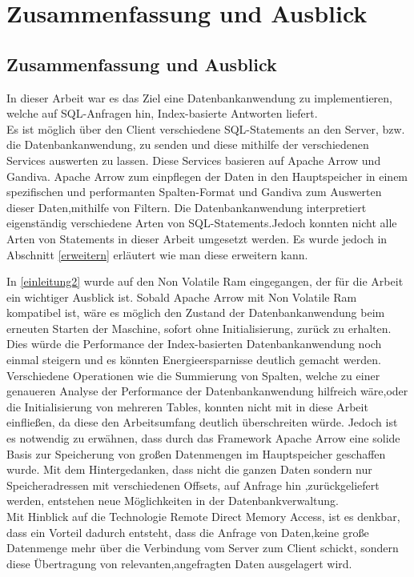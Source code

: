 \chapter{Zusammenfassung und Ausblick}
\label{Zusammenfassung}

\section{Zusammenfassung und Ausblick}

In dieser Arbeit war es das Ziel eine Datenbankanwendung zu implementieren, welche auf SQL-Anfragen hin, Index-basierte Antworten liefert. \\
Es ist möglich über den Client verschiedene SQL-Statements an den Server, bzw. die Datenbankanwendung, zu senden und diese mithilfe der verschiedenen Services auswerten zu lassen. 
Diese Services basieren auf Apache Arrow und Gandiva. Apache Arrow zum einpflegen der Daten in den Hauptspeicher in einem spezifischen und performanten Spalten-Format und Gandiva zum Auswerten dieser Daten,mithilfe von Filtern. 
Die Datenbankanwendung interpretiert eigenständig verschiedene Arten von SQL-Statements.Jedoch konnten nicht alle Arten von Statements in dieser Arbeit umgesetzt werden. 
Es wurde jedoch in Abschnitt \ref{erweitern} erläutert wie man diese erweitern kann.

In \ref{einleitung2} wurde auf den Non Volatile Ram eingegangen, der für die Arbeit ein wichtiger Ausblick ist. 
Sobald Apache Arrow mit Non Volatile Ram kompatibel ist, wäre es möglich den Zustand der Datenbankanwendung beim erneuten Starten der Maschine, sofort ohne Initialisierung, zurück zu erhalten. Dies würde die Performance der Index-basierten Datenbankanwendung noch einmal steigern und es könnten Energieersparnisse deutlich gemacht werden.
\\
Verschiedene Operationen wie die Summierung von Spalten, welche zu einer genaueren Analyse der Performance der Datenbankanwendung hilfreich wäre,oder die Initialisierung von mehreren Tables, konnten nicht mit in diese Arbeit einfließen, da diese den Arbeitsumfang deutlich überschreiten würde. Jedoch ist es notwendig zu erwähnen, dass durch das Framework Apache Arrow eine solide Basis zur Speicherung von großen Datenmengen im Hauptspeicher geschaffen wurde.
Mit dem Hintergedanken, dass nicht die ganzen Daten sondern nur Speicheradressen mit verschiedenen Offsets, auf Anfrage hin ,zurückgeliefert werden, entstehen neue Möglichkeiten in der Datenbankverwaltung.
\\ 
Mit Hinblick auf die Technologie Remote Direct Memory Access, ist es denkbar, dass ein Vorteil dadurch entsteht, dass die Anfrage von Daten,keine große Datenmenge mehr über die Verbindung vom Server zum Client schickt, sondern diese Übertragung von relevanten,angefragten Daten ausgelagert wird.

